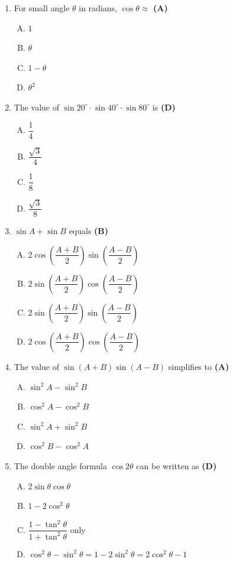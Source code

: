 \documentclass[10pt,a4paper]{article}
\begin{document}
\begin{enumerate}[1.]
\item For small angle $\theta$ in radians, $\cos\theta \approx$ \hfill \textbf{(A)}
\begin{enumerate}[(A)]
    \item $1$
    \item $\theta$
    \item $1 - \theta$
    \item $\theta^2$
\end{enumerate}

\item The value of $\sin 20^\circ \cdot \sin 40^\circ \cdot \sin 80^\circ$ is \hfill \textbf{(D)}
\begin{enumerate}[(A)]
    \item $\dfrac{1}{4}$
    \item $\dfrac{\sqrt{3}}{4}$
    \item $\dfrac{1}{8}$
    \item $\dfrac{\sqrt{3}}{8}$
\end{enumerate}

\item $\sin A + \sin B$ equals \hfill \textbf{(B)}
\begin{enumerate}[(A)]
    \item $2\cos\!\left(\dfrac{A+B}{2}\right)\sin\!\left(\dfrac{A-B}{2}\right)$
    \item $2\sin\!\left(\dfrac{A+B}{2}\right)\cos\!\left(\dfrac{A-B}{2}\right)$
    \item $2\sin\!\left(\dfrac{A+B}{2}\right)\sin\!\left(\dfrac{A-B}{2}\right)$
    \item $2\cos\!\left(\dfrac{A+B}{2}\right)\cos\!\left(\dfrac{A-B}{2}\right)$
\end{enumerate}

\item The value of $\sin(A+B)\sin(A-B)$ simplifies to \hfill \textbf{(A)}
\begin{enumerate}[(A)]
    \item $\sin^2 A - \sin^2 B$
    \item $\cos^2 A - \cos^2 B$
    \item $\sin^2 A + \sin^2 B$
    \item $\cos^2 B - \cos^2 A$
\end{enumerate}

\item The double angle formula $\cos 2\theta$ can be written as \hfill \textbf{(D)}
\begin{enumerate}[(A)]
    \item $2\sin\theta\cos\theta$
    \item $1 - 2\cos^2\theta$
    \item $\dfrac{1-\tan^2\theta}{1+\tan^2\theta}$ only
    \item $\cos^2\theta - \sin^2\theta = 1 - 2\sin^2\theta = 2\cos^2\theta - 1$
\end{enumerate}


\end{enumerate}
\end{document}
